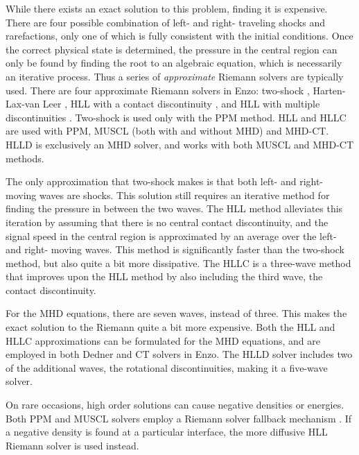 While there exists an exact solution to this problem, finding it is expensive.  There are four
possible combination of left- and right- traveling shocks and rarefactions,
only one of which is fully consistent with the initial conditions.  Once the
correct physical state is determined, the pressure in the central region can
only be found by finding the root to an algebraic equation, which is necessarily
an iterative process.  Thus a series of \emph{approximate} Riemann solvers are
typically used.  There are four approximate Riemann solvers in Enzo: two-shock
\citep{toro-1997},
Harten-Lax-van Leer \citep[HLL,][]{toro-1997}, HLL with a contact discontinuity
 \citep[HLLC,][]{toro-1997}, and HLL with
multiple discontinuities \citep[HLLD,][]{Miyoshi05}.  Two-shock is used only
with the PPM method.  HLL and HLLC are used with PPM, MUSCL (both with and
without MHD) and MHD-CT.  HLLD is exclusively an MHD solver, and works with both
MUSCL and MHD-CT methods.  

The only approximation that two-shock makes is that both left- and right- moving
waves are shocks.  This solution still requires an iterative method for finding
the pressure in between the two waves.  The HLL method alleviates this iteration
by assuming that there is no central contact discontinuity, and the signal speed
in the central region is approximated by an average over the left- and right-
moving waves.  This method is significantly faster than the two-shock method,
but also quite a bit more dissipative.  The HLLC is a three-wave method that improves upon the HLL
method by also including the third wave, the contact discontinuity.  

For the MHD equations, there are seven waves, instead of three.  This makes the
exact solution to the Riemann quite a bit more expensive.  Both the HLL and HLLC
approximations can be formulated for the MHD equations, and are employed in both
Dedner and CT solvers in Enzo.  The HLLD
solver includes two of the additional waves, the rotational discontinuities,
making it a five-wave solver.

On rare occasions, high order
solutions can cause negative densities or energies.  Both PPM and MUSCL solvers employ a Riemann
solver fallback mechanism \citep{Lemaster09}.  If a negative density is found at
a particular interface, the more diffusive HLL Riemann solver is used instead.  



